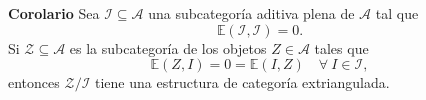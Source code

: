 \documentclass[preview]{standalone}
\begin{document}
\begin{center}
\justifying \textbf{Corolario} Sea $\mathscr{I}\subseteq\mathscr{A}$ una subcategoría aditiva plena de $\mathscr{A}$ tal que $$\mathbb{E}(\mathscr{I}, \mathscr{I})=0.$$ Si $\mathscr{Z}\subseteq\mathscr{A}$ es la subcategoría de los objetos $Z\in\mathscr{A}$ tales que $$\mathbb{E}(Z,I) = 0 = \mathbb{E}(I,Z) \quad \forall \ I\in\mathscr{I},$$ entonces $\mathscr{Z}/\mathscr{I}$ tiene una estructura de categoría extriangulada.
\end{center}
\end{document}
